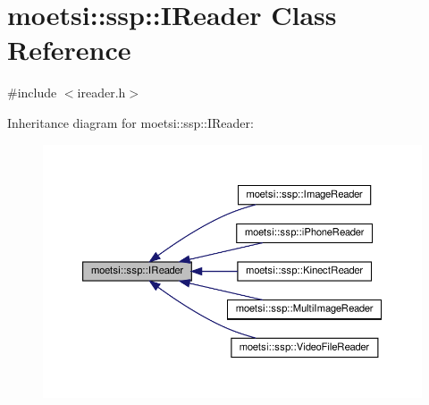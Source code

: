 \hypertarget{classmoetsi_1_1ssp_1_1IReader}{}\section{moetsi\+:\+:ssp\+:\+:I\+Reader Class Reference}
\label{classmoetsi_1_1ssp_1_1IReader}


{\ttfamily \#include $<$ireader.\+h$>$}



Inheritance diagram for moetsi\+:\+:ssp\+:\+:I\+Reader\+:
\nopagebreak
\begin{figure}[H]
\begin{center}
\leavevmode
\includegraphics[width=350pt]{classmoetsi_1_1ssp_1_1IReader__inherit__graph}
\end{center}
\end{figure}

